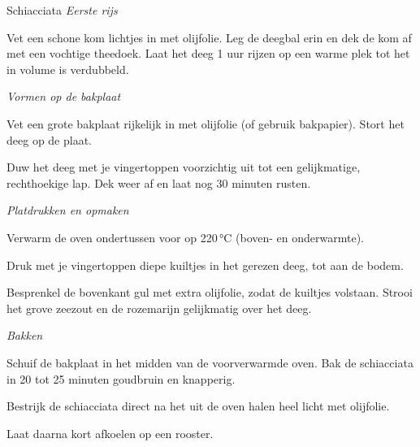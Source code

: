 \begin{recipe}{Schiacciata}
\medskip
\noindent\textit{Eerste rijs}
\begin{steps}
  \item Vet een schone kom lichtjes in met olijfolie. Leg de deegbal erin en
        dek de kom af met een vochtige theedoek. Laat het deeg 1 uur rijzen op
        een warme plek tot het in volume is verdubbeld.
\end{steps}

\medskip
\noindent\textit{Vormen op de bakplaat}
\begin{steps}
  \item Vet een grote bakplaat rijkelijk in met olijfolie (of gebruik
        bakpapier). Stort het deeg op de plaat.
  \item Duw het deeg met je vingertoppen voorzichtig uit tot een gelijkmatige,
        rechthoekige lap. Dek weer af en laat nog 30 minuten rusten.
\end{steps}

\medskip
\noindent\textit{Platdrukken en opmaken}
\begin{steps}
  \item Verwarm de oven ondertussen voor op 220\,°C (boven- en onderwarmte).
  \item Druk met je vingertoppen diepe kuiltjes in het gerezen deeg, tot aan
        de bodem.
  \item Besprenkel de bovenkant gul met extra olijfolie, zodat de kuiltjes
        volstaan. Strooi het grove zeezout en de rozemarijn gelijkmatig over
        het deeg.
\end{steps}

\medskip
\noindent\textit{Bakken}
\begin{steps}
  \item Schuif de bakplaat in het midden van de voorverwarmde oven. Bak de
        schiacciata in 20 tot 25 minuten goudbruin en knapperig.
  \item Bestrijk de schiacciata direct na het uit de oven halen heel licht
        met olijfolie.
  \item Laat daarna kort afkoelen op een rooster.
\end{steps}

\end{recipe}
